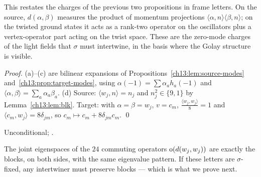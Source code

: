 \begin{physics}
This restates the charges of the previous two propositions in frame letters. On the source, $d(\alpha,\beta)$ measures the product of momentum projections $\langle\alpha,n\rangle\langle\beta,n\rangle$; on the twisted ground states it acts as a rank-two operator on the oscillators plus a vertex-operator part acting on the twist space. These are the zero-mode charges of the light fields that $\sigma$ must intertwine, in the basis where the Golay structure is visible.
\end{physics}
\noindent\emph{Proof.} (a)--(c) are bilinear expansions of
Propositions~\ref{ch13:lem:source-modes} and~\ref{ch13:prop:target-modes}, using
$\alpha(-1)=\sum\alpha_ah_a(-1)$ and $\langle\alpha,\beta\rangle=\sum_a\alpha_a\beta_a$. (d) Source: $\langle w_j,n\rangle=n_j$
and $n_j^2\in\{9,1\}$ by Lemma~\ref{ch13:lem:blk}. Target: with $\alpha=\beta=w_j$, $v=c_m$,
$\frac{\langle w_j,w_j\rangle}8=1$ and $\langle c_m,w_j\rangle=8\delta_{jm}$, so $c_m\mapsto c_m+8\delta_{jm}c_m$. \qed
\begin{status}Unconditional; .\end{status}

The joint eigenspaces of the $24$ commuting operators $\operatorname{o}(d(w_j,w_j))$ are exactly the blocks,
on both sides, with the same eigenvalue pattern. If these letters are $\sigma$-fixed, any intertwiner
must preserve blocks --- which is what we prove next.

